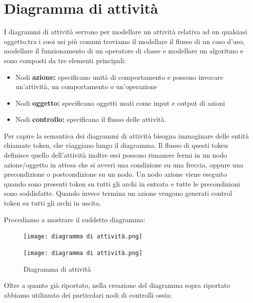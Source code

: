 \documentclass[a4paper, 11pt,oneside]{book}
\newcommand{\spacing}{\par\bigskip\noindent}
\begin{document}
    \section{Diagramma di attività}
        I diagrammi di attività servono per modellare un attività relativa ad un qualsiasi oggetto,tra i suoi usi più comuni troviamo il modellare il flusso di un caso d'uso, modellare il funzionamento di un operatore di classe e modellare un algoritmo e sono composti da tre elementi 
        principali:
        \begin{itemize}
            \item Nodi \textbf{azione:} specificano unità di comportamento e possono invocare un'attività, un comportamento o un'operazione
            \item Nodi \textbf{oggetto:} specificano oggetti usati come input e output di azioni
            \item Nodi \textbf{controllo:} specificano il flusso delle attività.
        \end{itemize}
        Per capire la semantica dei diagrammi di attività bisogna immaginare delle entità chiamate token, che viaggiano lungo il diagramma. Il flusso di questi token definisce quello dell'attività inoltre essi possono rimanere fermi in un nodo azione/oggetto in attesa che si avveri una condizione su una freccia,
        oppure una precondizione o postcondizione su un nodo. Un nodo azione viene eseguito quando sono presenti token su tutti gli archi in entrata e tutte le precondizioni sono soddisfatte. Quando invece termina un azione vengono generati control token su tutti gli archi in uscita.
        \spacing
        Procediamo a mostrare il suddetto diagramma:
        \begin{figure}[H]
            \centering
            \texttt{[image: diagramma di attività.png]}
        \end{figure}
        \begin{figure}[H]
            \continuedfloat
            \centering
            \texttt{[image: diagramma di attività.png]}
            \caption{Diagramma di attività}
            \label{fig:diagramma_attività}
        \end{figure}
        \spacing
        Oltre a quanto già riportato, nella creazione del diagramma sopra riportato abbiamo utilizzato dei particolari nodi di controlli ossia:
\end{document}
